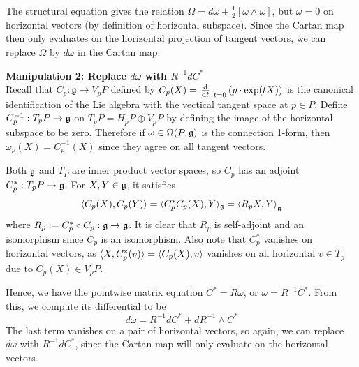 The structural equation gives the relation
$\Omega = d\omega + \frac{1}{2}[\omega\wedge \omega]$, but $\omega=0$ on
horizontal vectors (by definition of horizontal subspace). Since the Cartan map
then only evaluates on the horizontal projection of tangent vectors, we can 
replace  $\Omega$ by  $d\omega$ in the Cartan map. 

\vspace{1ex}\noindent
\textbf{Manipulation 2: Replace $d\omega$ with  $R^{-1}dC^*$} \\
Recall that $C_p : \mathfrak{g} \to V_pP$ defined by  $C_p(X) = \odv{}{t}_{t=0}
(p\cdot \exp(tX))$ is the canonical identification of the Lie algebra with the
vectical tangent space at $p\in P$. Define $C_p^{-1} : T_pP \to \operatorname{\mathfrak{g}}$ on
$T_pP=H_pP\oplus V_pP$ by
defining the image of the horizontal subspace to be zero. 
Therefore if $\omega\in \Omega(P,\operatorname{\mathfrak{g}})$ is 
the connection 1-form, then $\omega_p(X) = C_p^{-1}(X)$ since they agree on
all tangent vectors. 

Both $\operatorname{\mathfrak{g}}$ and  $T_P$ are inner product vector spaces,
so $C_p$ has an adjoint  $C_p^* : T_pP \to \operatorname{\mathfrak{g}}$. For $X,Y\in \operatorname{\mathfrak{g}}$, it
satisfies 
\[
	\gen{C_p(X), C_p(Y)} = \gen[*]{C_p^*C_p(X),Y}_{\g} = \gen{R_p X, Y}_{\g}
\] 
where $R_p := C_p^*\circ C_p : \operatorname{\mathfrak{g}} \to \operatorname{\mathfrak{g}}$. It is clear that $R_p$ is self-adjoint
and an isomorphism since $C_p$ is an isomorphism. 
Also note that $C_p^*$ vanishes on horizontal vectors, as 
$\gen[*]{X,C_p^*(v)} = \gen{C_p(X),v}$ vanishes on
all horizontal $v\in T_p$ due to $C_p(X)\in V_pP$. 

Hence, we have the
pointwise matrix equation $C^* = R\omega$, or $\omega = R^{-1}C^*$. From this,
we compute its differential to be
\[
d\omega = R^{-1} dC^* + dR^{-1} \wedge C^*
\] 
The last term vanishes on a pair of horizontal vectors, so again, we can replace
$d\omega$ with $R^{-1}dC^*$, since the Cartan map will only evaluate on the
horizontal vectors.


